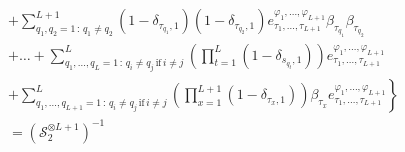 \documentclass[10pt]{article}
\numberwithin{equation}{section}
\numberwithin{equation}{subsection}
\begin{document}
\begin{align*}
    	\\&+\left. \sum_{q_{1},q_{2}=1\,:\,q_{1}\neq q_{2}}^{L+1}(1-\delta_{\tau_{q_{1}},1})(1-\delta_{\tau_{q_{2}},1})e_{\tau_{1},\ldots,\tau_{L+1}}^{\varphi_{1},\ldots,\varphi_{L+1}}\beta_{\tau_{q_{1}}}\beta_{\tau_{q_{2}}}\right.
    	\\&+\left.
    	\ldots+	\sum_{q_{1},\ldots,q_{L}=1\,:\,q_{i}\neq q_{j}\,\text{if}\,i\neq j}^{L}\left(\prod_{t=1}^{L}(1-\delta_{s_{q_{t}},1})\right)e_{\tau_{1},\ldots,\tau_{L+1}}^{\varphi_{1},\ldots,\varphi_{L+1}}
    	\right. \\&+ \left. 
    	\sum_{q_{1},\ldots,q_{L+1}=1\,:\,q_{i}\neq q_{j}\,\text{if}\,i\neq j}^{L}\left(\prod_{x=1}^{L+1}(1-\delta_{\tau_{x},1})\right)\beta_{\tau_{x}}e_{\tau_{1},\ldots,\tau_{L+1}}^{\varphi_{1},\ldots,\varphi_{L+1}} \right\}
    	\\&=
    	\left(\mathcal{S}_{2}^{\otimes L+1}\right)^{-1}
\end{align*}
\end{document}
